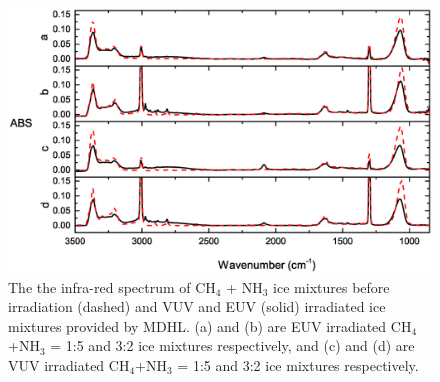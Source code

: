 \begin{figure}
\centering
\includegraphics[width=\textwidth]{figures/chapter3/NSRRC_MDHL_IR.eps}
\caption{The the infra-red spectrum of CH$_4$ + NH$_3$ ice mixtures before irradiation (dashed) and VUV and EUV (solid) irradiated ice mixtures provided by MDHL. (a) and (b) are EUV irradiated CH$_4$+NH$_3$ = 1:5 and 3:2 ice mixtures respectively, and (c) and (d) are VUV irradiated CH$_4$+NH$_3$ = 1:5 and 3:2 ice mixtures respectively.}
\label{fig:NSRRC_MDHL_IR}
\end{figure}


